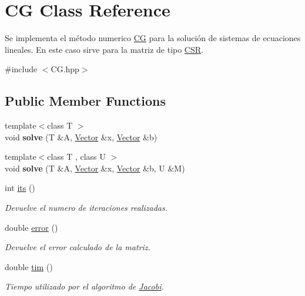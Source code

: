 \hypertarget{class_c_g}{}\section{CG Class Reference}
\label{class_c_g}


Se implementa el método numerico \hyperlink{class_c_g}{CG} para la solución de sistemas de ecuaciones lineales. En este caso sirve para la matriz de tipo \hyperlink{class_c_s_r}{C\+SR}.  




{\ttfamily \#include $<$C\+G.\+hpp$>$}

\subsection*{Public Member Functions}
\begin{DoxyCompactItemize}
\item 
\hypertarget{class_c_g_a14b5e2bb6f5c10bd3e81b497a05365f3}{}\label{class_c_g_a14b5e2bb6f5c10bd3e81b497a05365f3} 
{\footnotesize template$<$class T $>$ }\\void {\bfseries solve} (T \&A, \hyperlink{class_vector}{Vector} \&x, \hyperlink{class_vector}{Vector} \&b)
\item 
\hypertarget{class_c_g_ac2f7cfd0c29dd82f82747170eb1e62f9}{}\label{class_c_g_ac2f7cfd0c29dd82f82747170eb1e62f9} 
{\footnotesize template$<$class T , class U $>$ }\\void {\bfseries solve} (T \&A, \hyperlink{class_vector}{Vector} \&x, \hyperlink{class_vector}{Vector} \&b, U \&M)
\item 
int \hyperlink{class_c_g_a3c3895b0d931483af8d62bb80b80173c}{its} ()
\begin{DoxyCompactList}\small\item\em Devuelve el numero de iteraciones realizadas. \end{DoxyCompactList}\item 
double \hyperlink{class_c_g_a7fc212af782350d9a9a9fac5c6be62de}{error} ()
\begin{DoxyCompactList}\small\item\em Devuelve el error calculado de la matriz. \end{DoxyCompactList}\item 
double \hyperlink{class_c_g_ab1de59d8f4f6aa5c04a604db85bb7b2a}{tim} ()
\begin{DoxyCompactList}\small\item\em Tiempo utilizado por el algoritmo de \hyperlink{class_jacobi}{Jacobi}. \end{DoxyCompactList}\item 

\end{DoxyCompactItemize}
